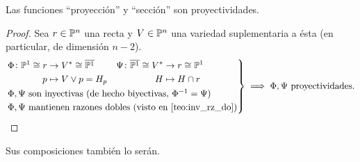 \begin{col}
  Las funciones ``proyección'' y ``sección'' son proyectividades.
\end{col}
\begin{proof}
  Sea $r \in \mathbb{P}^n$ una recta y $V \in \mathbb{P}^n$ una variedad suplementaria a ésta
  (en particular, de dimensión $n-2$).
  \[
    \begin{rcases}
      \begin{aligned}
      \Phi \colon \mathbb{P}^1 \cong r &\to V^\ast \cong \overline{\mathbb{P}^1} \\
      p &\mapsto V \vee p = H_p
      \end{aligned}
      \quad
      \begin{aligned}
      \Psi \colon \overline{\mathbb{P}^1} \cong V^* &\to r \cong \mathbb{P}^1 \\ H &\mapsto H \cap r
      \end{aligned} \\
      \Phi, \Psi \text{ son inyectivas (de hecho biyectivas, } \Phi^{-1} = \Psi
      \text{)}\\
      \Phi, \Psi \text{ mantienen razones dobles (visto en \ref{teo:inv_rz_do})}
  \end{rcases}
  \implies
  \Phi, \Psi \text{ proyectividades.}
 \]
\end{proof}

\begin{obs}
  Sus composiciones también lo serán.
\end{obs}
